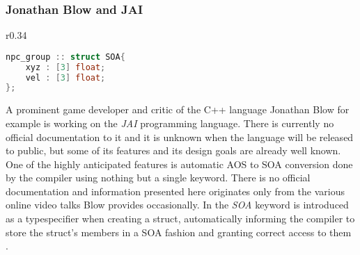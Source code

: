 \subsubsection{Jonathan Blow and JAI}
\begin{wrapfigure}[8]{r}{0.34\textwidth}
\begin{lstlisting}[language=C++,name={JAI's native SOA support},morekeywords={SOA}, label={jai_npc}]
npc_group :: struct SOA{
	xyz : [3] float;
	vel : [3] float;
};
\end{lstlisting}
\end{wrapfigure}
A prominent game developer and critic of the C++ language Jonathan Blow for example is working on the \textit{JAI} programming language. There is currently no official documentation to it and it is unknown when the language will be released to public, but some of its features and its design goals are already well known. One of the highly anticipated features is automatic AOS to SOA conversion done by the compiler using nothing but a single keyword. There is no official documentation and information presented here originates only from the various online video talks Blow provides occasionally. In  the \textit{SOA} keyword is introduced as a typespecifier when creating a struct, automatically informing the compiler to store the struct's members in a SOA fashion and granting correct access to them .

